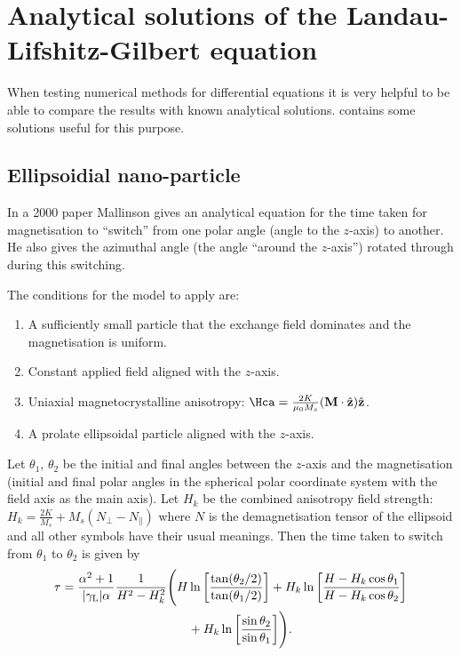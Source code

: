 \chapter{Analytical solutions of the Landau-Lifshitz-Gilbert equation}
\label{cha:analyt-solut-land}

When testing numerical methods for differential equations it is very helpful to be able to compare the results with known analytical solutions.
 contains some solutions useful for this purpose.

\section{Ellipsoidial nano-particle}

In a 2000 paper \cite{Mallinson2000} Mallinson gives an analytical equation for the time taken for magnetisation to ``switch'' from one polar angle (angle to the $z$-axis) to another.
He also gives the azimuthal angle (the angle ``around the $z$-axis'') rotated through during this switching.

The conditions for the model to apply are:
\begin{enumerate}
\item A sufficiently small particle that the exchange field dominates and the magnetisation is uniform.
\item Constant applied field aligned with the $z$-axis.
\item Uniaxial magnetocrystalline anisotropy: $\Hca = \frac{2 K}{\mu_0 M_s} \bigb{\Mv \cdot \unitz} \unitz$.
\item A prolate ellipsoidal particle aligned with the $z$-axis.
\end{enumerate}

Let $\theta_1$, $\theta_2$ be the initial and final angles between the $z$-axis and the magnetisation (\ie initial and final polar angles in the spherical polar coordinate system with the field axis as the main axis).
Let $H_k$ be the combined anisotropy field strength: $H_k = \frac{2 K}{M_s} + M_s(N_\perp - N_\parallel)$ where $N$ is the demagnetisation tensor of the ellipsoid and all other symbols have their usual meanings.
Then the time taken to switch from $\theta_1$ to $\theta_2$ is given by
\begin{equation}
  \begin{aligned}
    \tau = \frac{\alpha^2 +1}{{\left|{\gamma_{\mathrm{\tiny{L}}}} \right|} \alpha} \frac{1}{H^2 - H_k^2} \Bigg(
      H &\ln{\left[  \frac{\tan(\theta_2/2)}{\tan(\theta_1/2)}  \right]}
      + H_k \ln{\left[  \frac{H - H_k \cos\theta_1}{H - H_k \cos\theta_2}  \right]} \\
      &+ H_k \ln{\left[  \frac{\sin\theta_2}{\sin\theta_1}  \right]} \Bigg).
  \end{aligned}
\label{eq:80}
\end{equation}

